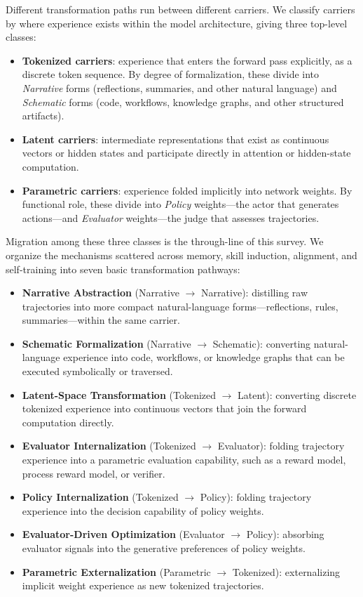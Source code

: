 Different transformation paths run between different carriers. We classify carriers by where experience exists within the model architecture, giving three top-level classes:
\begin{itemize}
  \item \textbf{Tokenized carriers}: experience that enters the forward pass explicitly, as a discrete token sequence. By degree of formalization, these divide into \emph{Narrative} forms (reflections, summaries, and other natural language) and \emph{Schematic} forms (code, workflows, knowledge graphs, and other structured artifacts).
  \item \textbf{Latent carriers}: intermediate representations that exist as continuous vectors or hidden states and participate directly in attention or hidden-state computation.
  \item \textbf{Parametric carriers}: experience folded implicitly into network weights. By functional role, these divide into \emph{Policy} weights---the actor that generates actions---and \emph{Evaluator} weights---the judge that assesses trajectories.
\end{itemize}

Migration among these three classes is the through-line of this survey. We organize the mechanisms scattered across memory, skill induction, alignment, and self-training into seven basic transformation pathways:
\begin{itemize}
  \item \textbf{Narrative Abstraction} (Narrative $\rightarrow$ Narrative): distilling raw trajectories into more compact natural-language forms---reflections, rules, summaries---within the same carrier.
  \item \textbf{Schematic Formalization} (Narrative $\rightarrow$ Schematic): converting natural-language experience into code, workflows, or knowledge graphs that can be executed symbolically or traversed.
  \item \textbf{Latent-Space Transformation} (Tokenized $\rightarrow$ Latent): converting discrete tokenized experience into continuous vectors that join the forward computation directly.
  \item \textbf{Evaluator Internalization} (Tokenized $\rightarrow$ Evaluator): folding trajectory experience into a parametric evaluation capability, such as a reward model, process reward model, or verifier.
  \item \textbf{Policy Internalization} (Tokenized $\rightarrow$ Policy): folding trajectory experience into the decision capability of policy weights.
  \item \textbf{Evaluator-Driven Optimization} (Evaluator $\rightarrow$ Policy): absorbing evaluator signals into the generative preferences of policy weights.
  \item \textbf{Parametric Externalization} (Parametric $\rightarrow$ Tokenized): externalizing implicit weight experience as new tokenized trajectories.
\end{itemize}

